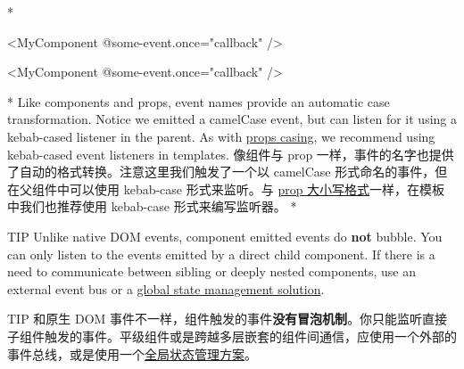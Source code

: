 \begin{paracol}{2}
\switchcolumn[0]*%
\begin{codeHtml}
<MyComponent @some-event.once="callback" />
\end{codeHtml}
\switchcolumn
\begin{codeHtml}
<MyComponent @some-event.once="callback" />
\end{codeHtml}
\switchcolumn[0]*%
Like components and props, event names provide an automatic case
transformation. Notice we emitted a camelCase event, but can listen for
it using a kebab-cased listener in the parent. As with
\href{https://vuejs.org/guide/components/props.html\#prop-name-casing}{props
casing}, we recommend using kebab-cased event listeners in templates.
\switchcolumn
像组件与 prop
一样，事件的名字也提供了自动的格式转换。注意这里我们触发了一个以
camelCase 形式命名的事件，但在父组件中可以使用 kebab-case 形式来监听。与
\href{https://cn.vuejs.org/guide/components/props.html\#prop-name-casing}{prop
大小写格式}一样，在模板中我们也推荐使用 kebab-case 形式来编写监听器。
\switchcolumn[0]*%
\begin{vueQuote}{TIP}
Unlike native DOM events, component emitted events do \textbf{not}
bubble. You can only listen to the events emitted by a direct child
component. If there is a need to communicate between sibling or deeply
nested components, use an external event bus or a
\href{https://vuejs.org/guide/scaling-up/state-management.html}{global
state management solution}.
\end{vueQuote} 
\switchcolumn
\begin{vueQuote}{TIP}
和原生 DOM
事件不一样，组件触发的事件\textbf{没有冒泡机制}。你只能监听直接子组件触发的事件。平级组件或是跨越多层嵌套的组件间通信，应使用一个外部的事件总线，或是使用一个\href{https://cn.vuejs.org/guide/scaling-up/state-management.html}{全局状态管理方案}。
\end{vueQuote} 
\end{paracol}

